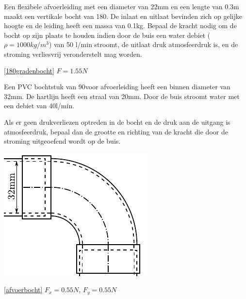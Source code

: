\begin{toepassing}
	\label{180gradenbocht}
Een flexibele afvoerleiding met een diameter van 22mm en een lengte van 0.3m maakt een vertikale bocht van 180\deg. De inlaat en uitlaat bevinden zich op gelijke hoogte en de leiding heeft een massa van 0.1kg. Bepaal de kracht nodig om de bocht op zijn plaats te houden indien door de buis een water debiet ($\rho=1000\unit{kg/m^3}$) van 50 l/min stroomt, de uitlaat druk atmosfeerdruk is, en de stroming verliesvrij veronderstelt mag worden.
\end{toepassing}
\begin{antwoord}{\ref{180gradenbocht}}
	$F = 1.55\unit{N}$
\end{antwoord}
\begin{toepassing}
	\label{afvoerbocht}
Een PVC bochtstuk van 90\deg voor afvoerleiding heeft een binnen diameter van 32mm. De hartlijn heeft een straal van 20mm. Door de buis stroomt water met een debiet van 40l/min.
		
Als er geen drukverliezen optreden in de bocht en de druk aan de uitgang is atmosfeerdruk, bepaal dan de grootte en richting van de kracht die door de stroming uitgeoefend wordt op de buis.

	\centering
	\includegraphics{fig/behoudsvergelijkingen/afvoerbocht}
\end{toepassing}
\begin{antwoord}{\ref{afvoerbocht}}
	$F_x = 0.55\unit{N}$, $F_y = 0.55\unit{N}$
\end{antwoord}

